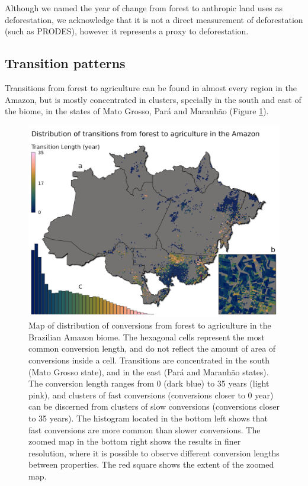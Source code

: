 \documentclass[essd, manuscript]{copernicus}
\begin{document}
Although we named the year of change from forest to anthropic land uses as deforestation, we acknowledge that it is not a direct measurement of deforestation (such as PRODES), however it represents a proxy to deforestation.

\subsection{Transition patterns}

Transitions from forest to agriculture can be found in almost every region in the Amazon, but is mostly concentrated in clusters, specially in the south and east of the biome, in the states of Mato Grosso, Pará and Maranhão (Figure \ref{fig:map-plot}).

\begin{figure}[h]
\includegraphics[width=17cm]{figs/map} \caption{Map of distribution of conversions from forest to agriculture in the Brazilian Amazon biome. The hexagonal cells represent the most common conversion length, and do not reflect the amount of area of conversions inside a cell. Transitions are concentrated in the south (Mato Grosso state), and in the east (Pará and Maranhão states). The conversion length ranges from 0 (dark blue) to 35 years (light pink), and clusters of fast conversions (conversions closer to 0 year) can be discerned from clusters of slow conversions (conversions closer to 35 years). The histogram located in the bottom left shows that fast conversions are more common than slower conversions. The zoomed map in the bottom right shows the results in finer resolution, where it is possible to observe different conversion lengths between properties. The red square shows the extent of the zoomed map.}\label{fig:map-plot}
\end{figure}
\end{document}
